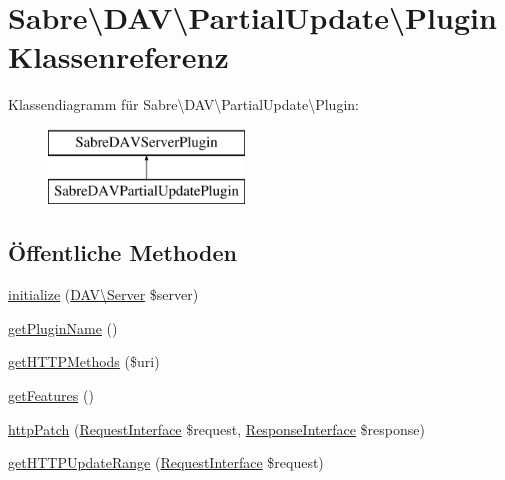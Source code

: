 \hypertarget{class_sabre_1_1_d_a_v_1_1_partial_update_1_1_plugin}{}\section{Sabre\textbackslash{}D\+AV\textbackslash{}Partial\+Update\textbackslash{}Plugin Klassenreferenz}
\label{class_sabre_1_1_d_a_v_1_1_partial_update_1_1_plugin}
Klassendiagramm für Sabre\textbackslash{}D\+AV\textbackslash{}Partial\+Update\textbackslash{}Plugin\+:\begin{figure}[H]
\begin{center}
\leavevmode
\includegraphics[height=2.000000cm]{class_sabre_1_1_d_a_v_1_1_partial_update_1_1_plugin}
\end{center}
\end{figure}
\subsection*{Öffentliche Methoden}
\begin{DoxyCompactItemize}
\item 
\mbox{\hyperlink{class_sabre_1_1_d_a_v_1_1_partial_update_1_1_plugin_a300742708ba8f5238f1c2604f3f17268}{initialize}} (\mbox{\hyperlink{class_sabre_1_1_d_a_v_1_1_server}{D\+A\+V\textbackslash{}\+Server}} \$server)
\item 
\mbox{\hyperlink{class_sabre_1_1_d_a_v_1_1_partial_update_1_1_plugin_aab2b6f5f359e998c446f37352cc5b3ff}{get\+Plugin\+Name}} ()
\item 
\mbox{\hyperlink{class_sabre_1_1_d_a_v_1_1_partial_update_1_1_plugin_a92dba6419f0749e9831c758aa46c1e96}{get\+H\+T\+T\+P\+Methods}} (\$uri)
\item 
\mbox{\hyperlink{class_sabre_1_1_d_a_v_1_1_partial_update_1_1_plugin_a45ca1eadd6e452906436632123614a3a}{get\+Features}} ()
\item 
\mbox{\hyperlink{class_sabre_1_1_d_a_v_1_1_partial_update_1_1_plugin_ab1948fb90473cb138f0ee10d1431e9ed}{http\+Patch}} (\mbox{\hyperlink{interface_sabre_1_1_h_t_t_p_1_1_request_interface}{Request\+Interface}} \$request, \mbox{\hyperlink{interface_sabre_1_1_h_t_t_p_1_1_response_interface}{Response\+Interface}} \$response)
\item 
\mbox{\hyperlink{class_sabre_1_1_d_a_v_1_1_partial_update_1_1_plugin_a2e4032369857168f76293ca270d71e2f}{get\+H\+T\+T\+P\+Update\+Range}} (\mbox{\hyperlink{interface_sabre_1_1_h_t_t_p_1_1_request_interface}{Request\+Interface}} \$request)
\end{DoxyCompactItemize}
